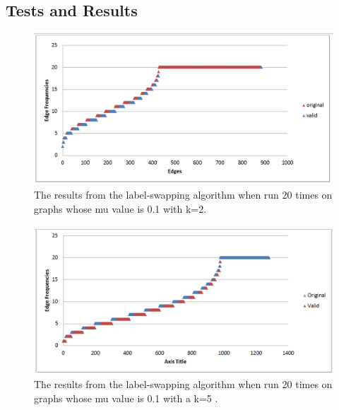\subsection{Tests and Results}

\begin{figure}[ht]
  \centering
  \includegraphics[scale=0.4 ]{mu=0_1 k=2 label.png}
  \caption{The results from the label-swapping algorithm when run 20 times on graphs whose mu value is 0.1 with k=2.}
  \label{fig:k=2 label-swap}
\end{figure}

\begin{figure}[ht]
  \centering
  \includegraphics[scale=0.4 ]{mu=0_1 k=5 label.png}
  \caption{The results from the label-swapping algorithm when run 20 times on graphs whose mu value is 0.1 with a k=5 .}
  \label{fig:k=5 label-swap}
\end{figure}
